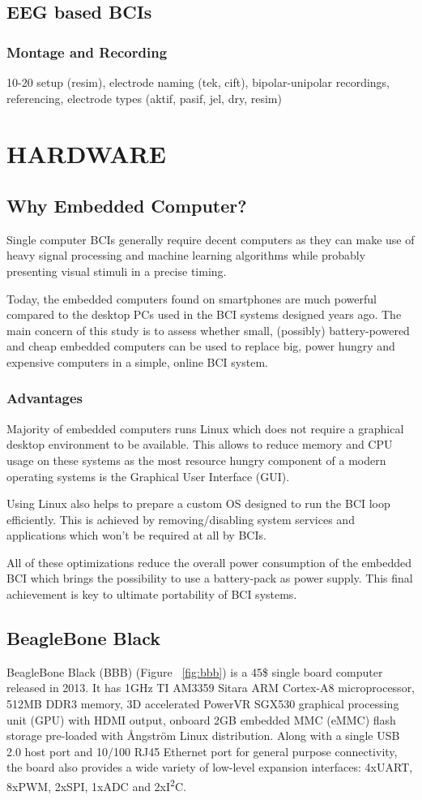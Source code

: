 \documentclass[12pt]{article}
\newcommand\mysection[1]{\vspace*{-0.35cm}\section{#1}\vspace*{6pt}\thispagestyle{empty}}
\newcommand\mysubsection[1]{\subsection{#1}}
\newcommand\mysubsubsection[1]{\subsubsection{#1}}
\numberwithin{equation}{section}
\numberwithin{figure}{section}
\numberwithin{table}{section}
\begin{document}
\mysubsection{EEG based BCIs}\label{seq:eeg_bci}
\mysubsubsection{Montage and Recording}\label{seq:eeg_recording}
\par{
10-20 setup (resim), electrode naming (tek, cift), bipolar-unipolar recordings, referencing, 
electrode types (aktif, pasif, jel, dry, resim)
}

\clearpage
\vspace*{-0.35cm}
\mysection{HARDWARE}\label{seq:hardware}

\mysubsection{Why Embedded Computer?}\label{seq:embeddedcomputer}

\par{
Single computer BCIs generally require decent computers as they can make use of heavy signal processing 
and machine learning algorithms while probably presenting visual stimuli in a precise timing.
}

\par{
Today, the embedded computers found on smartphones are much powerful compared to the desktop PCs 
used in the BCI systems designed years ago. The main concern of this study is to assess whether small, 
(possibly) battery-powered and cheap embedded computers can be used to replace big, power hungry and 
expensive computers in a simple, online BCI system.
}

\mysubsubsection{Advantages}\label{seq:embeddedcomputer_advantages}

\par{
Majority of embedded computers runs Linux which does not require a graphical desktop environment 
to be available. This allows to reduce memory and CPU usage on these systems as the most resource 
hungry component of a modern operating systems is the Graphical User Interface (GUI).
}

\par{
Using Linux also helps to prepare a custom OS designed to run the BCI loop efficiently. 
This is achieved by removing/disabling system services and applications which won't be required at all by BCIs.
}

\par{
All of these optimizations reduce the overall power consumption of the embedded BCI which brings 
the possibility to use a battery-pack as power supply. This final achievement is key to ultimate 
portability of BCI systems.
}

\mysubsection{BeagleBone Black}\label{seq:embeddedcomputer_bbb}

\par{
BeagleBone Black (BBB) (Figure ~\ref{fig:bbb}) is a 45\$ single board computer released in 2013. It has 1GHz TI AM3359 Sitara ARM Cortex-A8 microprocessor, 
512MB DDR3 memory, 3D accelerated PowerVR SGX530 graphical processing unit (GPU) with HDMI output, onboard 2GB embedded MMC (eMMC) 
flash storage pre-loaded with Ångström Linux distribution. Along with a single USB 2.0 host port and 10/100 RJ45 Ethernet port for general purpose connectivity, the board also provides a wide variety of low-level expansion interfaces: 
4xUART, 8xPWM, 2xSPI, 1xADC and 2xI\textsuperscript{2}C.
}
\end{document}
